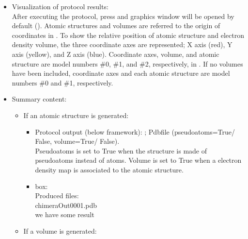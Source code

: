 \begin{itemize}
\begin{itemize}
 \end{itemize}
  \item Visualization of protocol results:\\
  
    After executing the protocol, press  and \chimera graphics window will be opened by default (). Atomic structures and volumes are referred to the origin of coordinates in \chimera. To show the relative position of atomic structure and electron density volume, the three coordinate axes are represented; X axis (red), Y axis (yellow), and Z axis (blue). Coordinate axes, volume, and atomic structure are model numbers \#0, \#1, and \#2, respectively, in \chimera {}. If no volumes have been included, coordinate axes and each atomic structure are model numbers \#0 and \#1, respectively.\\
   
  \item Summary content:\\
  
   \begin{itemize}
    \item If an atomic structure is generated:\\

    \begin{itemize}
     \item Protocol output (below \scipion framework):
      ; Pdbfile (pseudoatoms=True/ False, volume=True/ False).\\Pseudoatoms is set to True when the structure is made of pseudoatoms instead of atoms. Volume is set to True when a electron density map is associated to the atomic structure.\\
     \item {} box:\\Produced files:\\chimeraOut0001.pdb\\we have some result\\
    \end{itemize}
    \item If a volume is generated:\\
    

\end{itemize}
\end{itemize}
